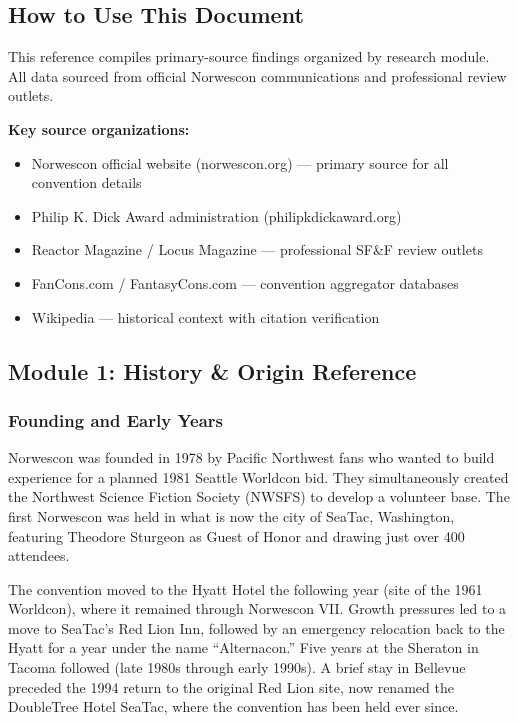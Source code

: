 \documentclass[11pt,letterpaper]{article}
\begin{document}
\subsection{How to Use This Document}

This reference compiles primary-source findings organized by research module. All data sourced from official Norwescon communications and professional review outlets.

\textbf{Key source organizations:}
\begin{itemize}[leftmargin=2em]
\item Norwescon official website (norwescon.org) --- primary source for all convention details
\item Philip K. Dick Award administration (philipkdickaward.org)
\item Reactor Magazine / Locus Magazine --- professional SF\&F review outlets
\item FanCons.com / FantasyCons.com --- convention aggregator databases
\item Wikipedia --- historical context with citation verification
\end{itemize}

\subsection{Module 1: History \& Origin Reference}

\subsubsection{Founding and Early Years}

Norwescon was founded in 1978 by Pacific Northwest fans who wanted to build experience for a planned 1981 Seattle Worldcon bid. They simultaneously created the Northwest Science Fiction Society (NWSFS) to develop a volunteer base. The first Norwescon was held in what is now the city of SeaTac, Washington, featuring Theodore Sturgeon as Guest of Honor and drawing just over 400 attendees.

The convention moved to the Hyatt Hotel the following year (site of the 1961 Worldcon), where it remained through Norwescon VII. Growth pressures led to a move to SeaTac's Red Lion Inn, followed by an emergency relocation back to the Hyatt for a year under the name ``Alternacon.'' Five years at the Sheraton in Tacoma followed (late 1980s through early 1990s). A brief stay in Bellevue preceded the 1994 return to the original Red Lion site, now renamed the DoubleTree Hotel SeaTac, where the convention has been held ever since.
\end{document}
